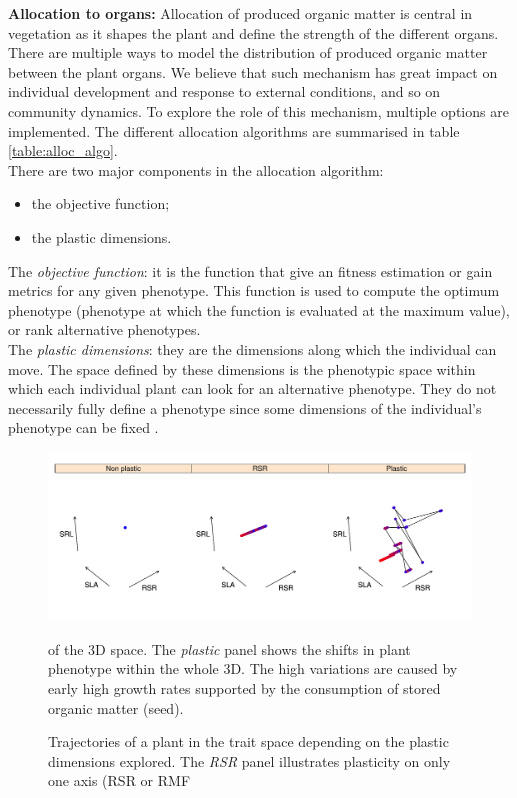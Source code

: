 \textbf{Allocation to organs:} Allocation of produced organic matter is central in vegetation as it shapes the plant and define the strength of the different organs. There are multiple ways to model the distribution of produced organic matter between the plant organs. We believe that such mechanism has great impact on individual development and response to external conditions, and so on community dynamics. To explore the role of this mechanism, multiple options are implemented. The different allocation algorithms are summarised in table \ref{table:alloc_algo}.\\
\indent There are two major components in the allocation algorithm:
\begin{itemize}
\item the objective function;
\item the plastic dimensions.
\end{itemize}
The \textit{objective function}: it is the function that give an fitness estimation or gain metrics for any given phenotype. This function is used to compute the optimum phenotype (phenotype at which the function is evaluated at the maximum value), or rank alternative phenotypes. \\
The \textit{plastic dimensions}: they are the dimensions along which the individual can move. The space defined by these dimensions is the phenotypic space within which each individual plant can look for an alternative phenotype. They do not necessarily fully define a phenotype since some dimensions of the individual's phenotype can be fixed . \\
\begin{figure}
\includegraphics{./Figures/strategy_space_algo.pdf}
\caption{Trajectories of a plant in the trait space depending on the plastic dimensions explored. The \textit{RSR} panel illustrates plasticity on only one axis (RSR or RMF} of the 3D space. The \textit{plastic} panel shows the shifts in plant phenotype within the whole 3D. The high variations are caused by early high growth rates supported by the consumption of stored organic matter (seed).
\end{figure}
